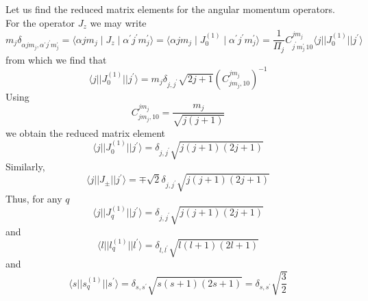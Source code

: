 \documentclass[a4paper,oneside,12pt]{extarticle}
\begin{document}
Let us find the reduced matrix elements for the angular momentum operators. For the operator $J_z$ we may write
\begin{equation}
m_j\delta_{\alpha jm_j, \alpha^\prime j^\prime m_j^\prime} = \langle \alpha jm_j \mid J_z \mid \alpha^\prime j^\prime m_j^\prime \rangle =
\langle \alpha jm_j \mid J_0^{(1)} \mid \alpha^\prime j^\prime m_j^\prime \rangle =
\frac{1}{\Pi_j} C_{j^\prime m_j^\prime\, 10}^{jm_j} \langle j || J_0^{(1)} || j^\prime \rangle
\end{equation}
%
from which we find that
%
\begin{equation}
\langle j || J_0^{(1)} || j^\prime \rangle = m_j \delta_{j,j^\prime} \sqrt{2j+1}
\left( C_{j m_j, 10}^{jm_j} \right)^{-1}
\end{equation}
%
Using
$$
C_{j m_j, 10}^{jm_j} = \frac{m_j}{\sqrt{j(j+1)}} 
$$
we obtain the reduced matrix element
\begin{equation}
\langle j || J_0^{(1)} || j^\prime \rangle = \delta_{j,j^\prime} \sqrt{j(j+1)(2j+1)}
\end{equation}
%
Similarly,
\begin{equation}
\langle j || J_{\pm} || j^\prime \rangle = \mp \sqrt{2}\delta_{j,j^\prime} \sqrt{j(j+1)(2j+1)}
\end{equation}
Thus, for any $q$
\begin{equation}
\langle j || J_{q}^{(1)} || j^\prime \rangle = \delta_{j,j^\prime} \sqrt{j(j+1)(2j+1)}
\end{equation}
and
\begin{equation}
\langle l || l_q^{(1)} || l^\prime \rangle = \delta_{l,l^\prime} \sqrt{l(l+1)(2l+1)}
\end{equation}
and
\begin{equation}
\langle s || s_q^{(1)} || s^\prime \rangle = \delta_{s,s^\prime} \sqrt{s(s+1)(2s+1)} = \delta_{s,s^\prime} \sqrt{\frac{3}{2}}
\end{equation}
%
\end{document}
